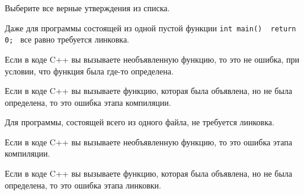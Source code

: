 \documentclass[9pt]{beamer}
\begin{document}
\begin{frame}
    Выберите все верные утверждения из списка.
    \begin{description}[align=left]
        \item[\XBox] Даже для программы состоящей из одной пустой функции \texttt{int main() { return 0; }} все равно требуется линковка.
        \item[\Square] Если в коде C++ вы вызываете необъявленную функцию, то это не ошибка, при условии, что функция была где-то определена.
        \item[\Square] Если в коде C++ вы вызываете функцию, которая была объявлена, но не была определена, то это ошибка этапа компиляции.
        \item[\Square] Для программы, состоящей всего из одного файла, не требуется линковка.
        \item[\XBox] Если в коде C++ вы вызываете необъявленную функцию, то это ошибка этапа компиляции.
        \item[\XBox] Если в коде C++ вы вызываете функцию, которая была объявлена, но не была определена, то это ошибка этапа линковки.
    \end{description}
\end{frame}
\end{document}
